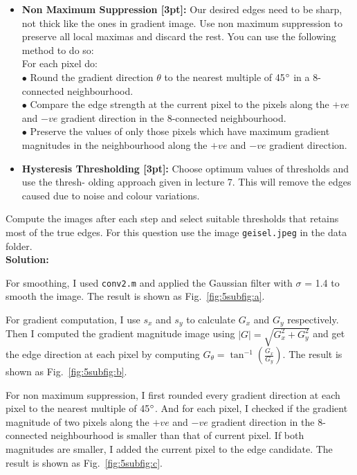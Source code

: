 \documentclass{assignment}
\begin{document}
\begin{problemlist}
\begin{itemize}
    \item\textbf{Non Maximum Suppression [3pt]:}
    Our desired edges need to be sharp, not thick like the ones in gradient image. Use non maximum suppression to preserve all local maximas and discard the rest. You can use the following method to do so:\\
    For each pixel do:\\
    $\bullet$ Round the gradient direction $\theta$ to the nearest multiple of 45$\degree$ in a 8-connected neighbourhood.\\
    $\bullet$ Compare the edge strength at the current pixel to the pixels along the $+ve$ and $−ve$ gradient direction in the 8-connected neighbourhood.\\
    $\bullet$ Preserve the values of only those pixels which have maximum gradient magnitudes in the neighbourhood along the $+ve$ and $−ve$ gradient direction.\\
        
    \item\textbf{Hysteresis Thresholding [3pt]:}
    Choose optimum values of thresholds and use the thresh- olding approach given in lecture 7. This will remove the edges caused due to noise and colour variations.
\end{itemize}
Compute the images after each step and select suitable thresholds that retains most of the true edges. For this question use the image \texttt{geisel.jpeg} in the data folder.\\

\newpage
\textbf{Solution:}

For smoothing, I used \texttt{conv2.m} and applied the Gaussian filter with $\sigma$ = 1.4 to smooth the image. The result is shown as Fig.~\ref{fig:5subfig:a}.

For gradient computation, I use $s_x$ and $s_y$ to calculate $G_x$ and $G_y$ respectively. Then I computed the gradient magnitude image using $|G| = \sqrt{G^{2}_x + G^{2}_y}$ and get the edge direction at each pixel by computing $G_{\theta} = \tan^{-1}(\frac{G_x}{G_y}).$ The result is shown as Fig.~\ref{fig:5subfig:b}.

For non maximum suppression, I first rounded every gradient direction at each pixel to the nearest multiple of 45$\degree$. And for each pixel, I checked if the gradient magnitude of two pixels along the $+ve$ and $−ve$ gradient direction in the 8-connected neighbourhood is smaller than that of current pixel. If both magnitudes are smaller, I added the current pixel to the edge candidate. The result is shown as Fig.~\ref{fig:5subfig:c}.


\end{problemlist}
\end{document}

